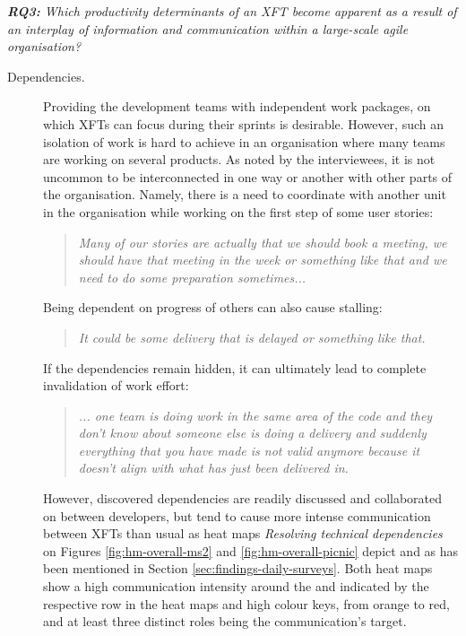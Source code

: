 \textit{\textbf{RQ3:} Which productivity determinants of an \ac{XFT} become apparent as a result of an interplay of information and communication within a large-scale agile organisation?}

\begin{description}

   \item[Dependencies.] Providing the development teams with independent work packages, on which \acp{XFT} can focus during their sprints is  desirable. However, such an isolation of work is hard to achieve in an organisation where many teams are working on several products. As noted by the interviewees, it is not uncommon to be interconnected in one way or another with other parts of the organisation. Namely, there is a need to coordinate with another unit in the organisation while working on the first step of some user stories:

      \begin{quote}\itshape Many of our stories are actually that we should book a meeting, we should have that meeting in the week or something like that and we need to do some preparation sometimes...
      \end{quote}

   Being dependent on progress of others can also cause stalling:

      \begin{quote}\itshape It could be some delivery that is delayed or something like that.
      \end{quote}

   If the dependencies remain hidden, it can ultimately lead to complete invalidation of work effort:

      \begin{quote}\itshape... one team is doing work in the same area of the code and they don’t know about someone else is doing a delivery and suddenly everything that you have made is not valid anymore because it doesn’t align with what has just been delivered in.
      \end{quote}

However, discovered dependencies are readily discussed and collaborated on between developers, but tend to cause more intense communication between \acp{XFT} than usual as heat maps \emph{Resolving technical dependencies} on Figures \ref{fig:hm-overall-ms2} and \ref{fig:hm-overall-picnic} depict and as has been mentioned in Section \ref{sec:findings-daily-surveys}. Both heat maps show a high communication intensity around the  and  indicated by the respective row in the heat maps and high colour keys, from orange to red, and at least three distinct roles being the communication's target.


\end{description}
